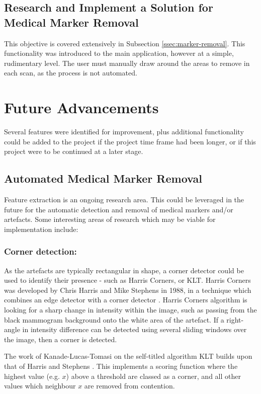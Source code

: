 \subsection{Research and Implement a Solution for Medical Marker Removal}

This objective is covered extensively in Subsection \ref{ssec:marker-removal}. This functionality was introduced to the main application, however at a simple, rudimentary level. The user must manually draw around the areas to remove in each scan, as the process is not automated.


\section{Future Advancements}
\label{ssec:improvements}

Several features were identified for improvement, plus additional functionality could be added to the project if the project time frame had been longer, or if this project were to be continued at a later stage.

\subsection{Automated Medical Marker Removal}
Feature extraction is an ongoing research area. This could be leveraged in the future for the automatic detection and removal of medical markers and/or artefacts. Some interesting areas of research which may be viable for implementation include:

\subsubsection{Corner detection: } As the artefacts are typically rectangular in shape, a corner detector could be used to identify their presence - such as Harris Corners, or KLT. Harris Corners was developed by Chris Harris and Mike Stephens in 1988, in a technique which combines an edge detector with a corner detector \cite{Harris_Stephens_1988}. Harris Corners algorithm is looking for a sharp change in intensity within the image, such as passing from the black mammogram background onto the white area of the artefact. If a right-angle in intensity difference can be detected using several sliding windows over the image, then a corner is detected.

The work of Kanade-Lucas-Tomasi on the self-titled algorithm \acrshort{KLT} builds upon that of Harris and Stephens \cite{Shi_Tomasi_1994} \cite{tomasi2004detection}. This implements a scoring function where the highest value (e.g. $x$) above a threshold are classed as a corner, and all other values which neighbour $x$ are removed from contention.

